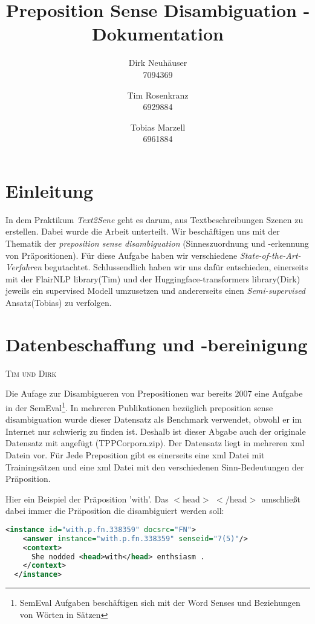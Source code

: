 \documentclass[10pt,a4paper]{article}
\newcommand{\chapterauthor}[1]{%
	{\parindent0pt\vspace*{-5pt}\hspace*{\fill}%
  \linespread{1.1}\large\scshape#1%
  \par\nobreak\vspace*{10pt}}
}
\begin{document}
\title{Preposition Sense Disambiguation - Dokumentation}
 
\author{
Dirk Neuhäuser \\ 7094369
\and
Tim Rosenkranz \\ 6929884
\and 
Tobias Marzell \\ 6961884
}

\maketitle
\tableofcontents


\section{Einleitung}
In dem Praktikum \textit{Text2Sene} geht es darum, aus Textbeschreibungen Szenen zu erstellen. Dabei wurde die Arbeit unterteilt. Wir beschäftigen uns mit der Thematik der \textit{preposition sense disambiguation} (Sinneszuordnung und -erkennung von Präpositionen). Für diese Aufgabe haben wir verschiedene \textit{State-of-the-Art-Verfahren} begutachtet. Schlussendlich haben wir uns dafür entschieden, einerseits mit der FlairNLP library(Tim) und der Huggingface-transformers library(Dirk) jeweils ein supervised Modell umzusetzen und andererseits einen \textit{Semi-supervised} Ansatz(Tobias) zu verfolgen.


\section{Datenbeschaffung und -bereinigung}
\chapterauthor{Tim und Dirk}
Die Aufage zur Disambigueren von Prepositionen war bereits 2007 eine Aufgabe in der SemEval\footnote{SemEval Aufgaben beschäftigen sich mit der Word Senses und Beziehungen von Wörten in Sätzen}. In mehreren Publikationen bezüglich preposition sense disambiguation wurde dieser Datensatz als Benchmark verwendet, obwohl er im Internet nur schwierig zu finden ist. Deshalb ist dieser Abgabe auch der originale Datensatz mit angefügt (TPPCorpora.zip). Der Datensatz liegt in mehreren xml Datein vor. Für Jede Preposition gibt es einerseits eine xml Datei mit Trainingsätzen und eine xml Datei mit den verschiedenen Sinn-Bedeutungen der Präposition.

Hier ein Beispiel der Präposition 'with'. Das $<$head$>$ $<$/head$>$ umschließt dabei immer die Präposition die disambiguiert werden soll: 

\begin{lstlisting}[language=xml]
  <instance id="with.p.fn.338359" docsrc="FN">
    <answer instance="with.p.fn.338359" senseid="7(5)"/>
    <context>
      She nodded <head>with</head> enthsiasm .
    </context>
  </instance>
\end{lstlisting}
\end{document}
